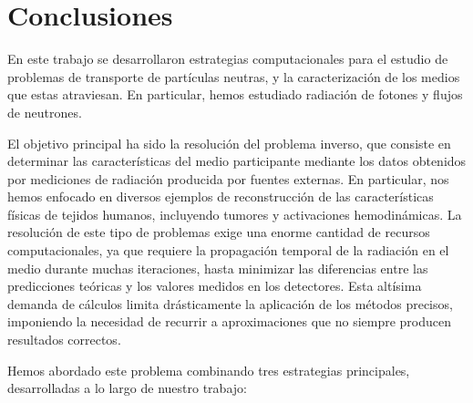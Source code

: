 
\pagestyle{fancy}
\chapter{Conclusiones}
\label{cap:conc}
\lhead{\thepage}
\vspace{0.01\textheight}

\clearpage \pagebreak 
En este trabajo se desarrollaron estrategias computacionales para el 
estudio de problemas de transporte de partículas neutras, y la 
caracterización de los medios que estas atraviesan.
En particular, hemos estudiado radiación de fotones y 
flujos de neutrones.

El objetivo principal ha sido la resolución del 
problema inverso, que consiste en determinar las características 
del medio participante mediante los datos obtenidos por mediciones 
de radiación producida por fuentes externas.
En particular, nos hemos enfocado en diversos ejemplos de 
reconstrucción de las características físicas de tejidos humanos, 
incluyendo tumores y activaciones hemodinámicas.
La resolución de este tipo de problemas exige una enorme cantidad 
de recursos computacionales, ya que requiere la propagación temporal 
de la radiación en el medio durante muchas iteraciones, 
hasta minimizar las diferencias entre las predicciones teóricas y 
los valores medidos en los detectores. 
Esta altísima demanda de cálculos limita drásticamente 
la aplicación de los métodos precisos, imponiendo la necesidad de 
recurrir a aproximaciones que no siempre producen resultados correctos.

Hemos abordado este problema combinando tres estrategias principales, 
desarrolladas a lo largo de nuestro trabajo:

